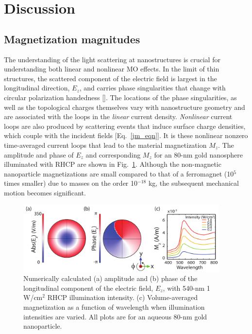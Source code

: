 \section{Discussion}
\subsection{Magnetization magnitudes}
\indent The understanding of the light scattering at nanostructures is crucial for understanding both linear and nonlinear MO effects. In the limit of thin structures, the scattered component of the electric field is largest in the longitudinal direction, $E_z$, and carries phase singularities that change with circular polarization handedness [\cite{Vuong,Hasman}]. The locations of the phase singularities, as well as the topological charges themselves vary with nanostructure geometry and are associated with the loops in the {\it linear} current density. \textit{Nonlinear} current loops are also produced by scattering events that induce surface charge densities, which couple with the incident fields [Eq.~\ref{jm_eqn}]. It is these nonlinear nonzero time-averaged current loops that lead to the material magnetization $M_z$. The amplitude and phase of $E_z$ and corresponding $M_z$ for an 80-nm gold nanosphere illuminated with RHCP are shown in Fig.~\ref{Ez}. Although the non-magnetic nanoparticle magnetizations are small compared to that of a ferromagnet (10$^5$ times smaller) due to masses on the order 10$^{-18}$ kg, the subsequent mechanical motion becomes significant.
\begin{figure}[t!]
\centering
\includegraphics[width=0.95\textwidth]{EzMz}
\caption{Numerically calculated (a) amplitude and (b) phase of the longitudinal component of the electric field, $E_z$, with 540-nm 1 W/cm$^2$ RHCP illumination intensity. (c) Volume-averaged magnetization as a function of wavelength when illumination intensities are varied. All plots are for an aqueous 80-nm gold nanoparticle.}
\label{Ez}
\end{figure}

